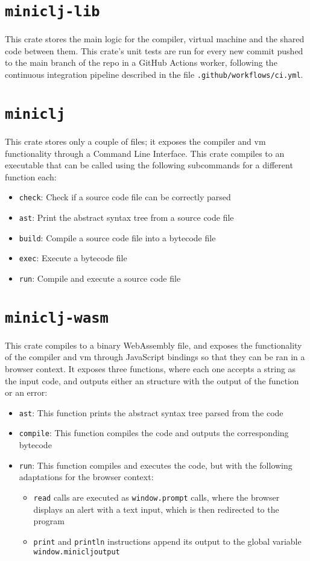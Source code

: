 \documentclass[11pt]{scrreprt}
\begin{document}
\section{\texttt{miniclj-lib}}
This crate stores the main logic for the compiler, virtual machine and the shared code between them. This crate's unit tests are run for every new commit pushed to the main branch of the repo in a GitHub Actions worker, following the continuous integration pipeline described in the file \texttt{.github/workflows/ci.yml}.

\section{\texttt{miniclj}}
This crate stores only a couple of files; it exposes the compiler and vm functionality through a Command Line Interface. This crate compiles to an executable that can be called using the following subcommands for a different function each:
\begin{itemize}
  \item \texttt{check}: Check if a source code file can be correctly parsed 
  \item \texttt{ast}: Print the abstract syntax tree from a source code file
  \item \texttt{build}: Compile a source code file into a bytecode file
  \item \texttt{exec}: Execute a bytecode file
  \item \texttt{run}: Compile and execute a source code file
\end{itemize}

\section{\texttt{miniclj-wasm}}
This crate compiles to a binary WebAssembly file, and exposes the functionality of the compiler and vm through JavaScript bindings so that they can be ran in a browser context. It exposes three functions, where each one accepts a string as the input code, and outputs either an structure with the output of the function or an error:
\begin{itemize}
  \item \texttt{ast}: This function prints the abstract syntax tree parsed from the code
  \item \texttt{compile}: This function compiles the code and outputs the corresponding bytecode
  \item \texttt{run}: This function compiles and executes the code, but with the following adaptations for the browser context:
  \begin{itemize}
    \item \texttt{read} calls are executed as \texttt{window.prompt} calls, where the browser displays an alert with a text input, which is then redirected to the program 
    \item \texttt{print} and \texttt{println} instructions append its output to the global variable \\\texttt{window.minicljoutput}
  \end{itemize}
\end{itemize}
\end{document}
